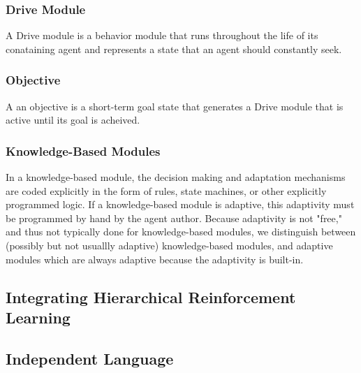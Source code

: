 \subsubsection{Drive Module}

A Drive module is a behavior module that runs throughout the life of
its conataining agent and represents a state that an agent should
constantly seek.


\subsubsection{Objective}

A an objective is a short-term goal state that generates a Drive module
that is active until its goal is acheived.


\subsubsection{Knowledge-Based Modules}

In a knowledge-based module, the decision making and adaptation
mechanisms are coded explicitly in the form of rules, state machines,
or other explicitly programmed logic.  If a knowledge-based module is
adaptive, this adaptivity must be programmed by hand by the agent
author.  Because adaptivity is not "free," and thus not typically done
for knowledge-based modules, we distinguish between (possibly but not
usuallly adaptive) knowledge-based modules, and adaptive modules which
are always adaptive because the adaptivity is built-in.


\subsection{Integrating Hierarchical Reinforcement Learning}

\subsection{Independent Language}
